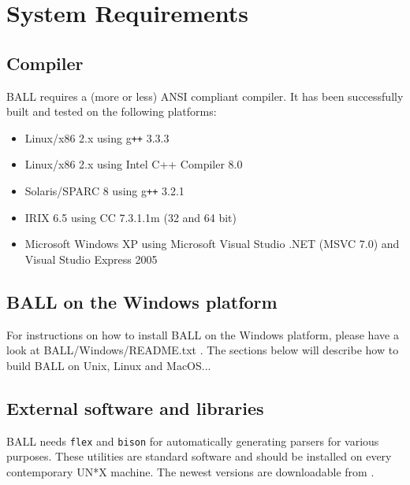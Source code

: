 \section{System Requirements}

\subsection{Compiler}
  BALL requires a (more or less) ANSI compliant \CPP compiler.
  It has been successfully built and tested on the following platforms:
	\begin{itemize}	
   	\item Linux/x86 2.x using g{\tt ++} 3.3.3
   	\item Linux/x86 2.x using Intel C++ Compiler 8.0
   	\item Solaris/SPARC 8 using g{\tt ++} 3.2.1
   	\item IRIX 6.5 using CC 7.3.1.1m (32 and 64 bit)
		\item Microsoft Windows XP using Microsoft Visual Studio .NET (MSVC 7.0) and Visual Studio Express 2005
 	\end{itemize}

\subsection{BALL on the Windows platform}

For instructions on how to install BALL on the Windows platform, please
have a look at BALL/Windows/README.txt . The sections below will describe
how to build BALL on Unix, Linux and MacOS...

\subsection{External software and libraries}

BALL needs {\tt flex} and {\tt bison} for automatically generating parsers
for various purposes. These utilities are standard software and should be
installed on every contemporary UN*X machine. The newest versions are
downloadable from .

